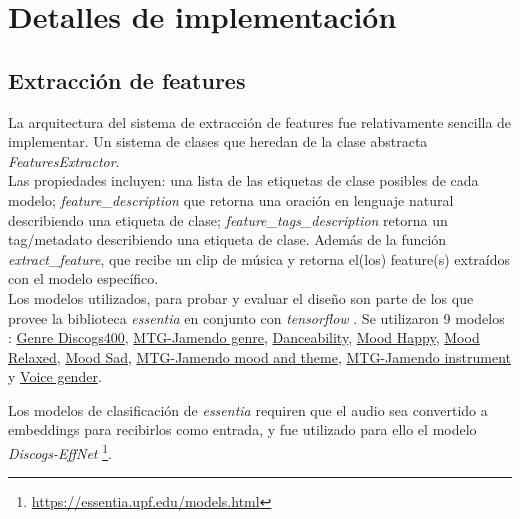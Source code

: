 \section{Detalles de implementación}
\label{sec:implementation}
\subsection{Extracción de features}
\label{subsec:essentia}
La arquitectura del sistema de extracción de features fue relativamente sencilla de implementar. Un sistema de clases que heredan de la clase abstracta \textit{FeaturesExtractor}. \\
Las propiedades incluyen: una lista de las etiquetas de clase posibles de cada modelo; \textit{feature\_description} que retorna una oración en lenguaje natural describiendo una etiqueta de clase; \textit{feature\_tags\_description} retorna un tag/metadato describiendo una etiqueta de clase. Además de la función \textit{extract\_feature}, que recibe un clip de música y retorna el(los) feature(s) extraídos con el modelo específico. \\
Los modelos utilizados, para probar y evaluar el diseño son parte de los que provee la biblioteca \textit{essentia} en conjunto con \textit{tensorflow} \cite{alonso2020tensorflow}. Se utilizaron 9 modelos : \href{https://essentia.upf.edu/models.html#genre-discogs400}{Genre Discogs400}, \href{https://essentia.upf.edu/models.html#mtg-jamendo-genre}{MTG-Jamendo genre},  \href{https://essentia.upf.edu/models.html#danceability}{Danceability}, \href{https://essentia.upf.edu/models.html#mood-happy}{Mood Happy}, \href{https://essentia.upf.edu/models.html#mood-relaxed}{Mood Relaxed}, \href{https://essentia.upf.edu/models.html#mood-sad}{Mood Sad}, \href{https://essentia.upf.edu/models.html#mtg-jamendo-mood-and-theme}{MTG-Jamendo mood and theme}, \href{https://essentia.upf.edu/models.html#mtg-jamendo-instrument}{MTG-Jamendo instrument} y \href{https://essentia.upf.edu/models.html#voice-gender}{Voice gender}.

Los modelos de clasificación de \textit{essentia} requiren que el audio sea convertido a embeddings para recibirlos como entrada, y fue utilizado para ello el modelo \textit{Discogs-EffNet} \footnote{\href{https://essentia.upf.edu/models.html}{https://essentia.upf.edu/models.html}}.

